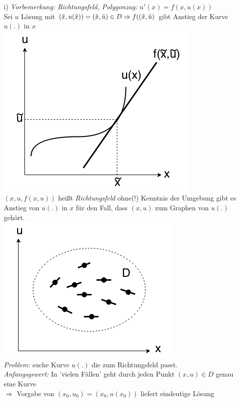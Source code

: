 \begin{enumerate}
    \item[i)] \emph{Vorbemerkung: Richtungsfeld, Polygonzug:} $u'(x) = f(x, u(x))$\\
        Sei $u$ Lösung mit $(\tilde{x}, u(\tilde{x})) = (\tilde{x}, \tilde{u}) \in D\\
        \Rightarrow f((\tilde{x}, \tilde{u}) $ gibt Anstieg der Kurve $u(.) $ in $x$\\
        \includegraphics[scale=0.5]{pictures/011-04.png}\\
        $(x, u, f(x,u)) $ heißt \emph{Richtungsfeld}
        ohne(!) Kenntnis der Umgebung gibt es Anstieg von $u(.)$ in $x$ 
        für den Fall, dass $(x,u) $ zum Graphen von $u(.) $ gehört.\\
        \includegraphics[scale=0.5]{pictures/011-05.png}\\
        \emph{Problem:} suche Kurve $u(.) $ die zum Richtungsfeld passt.\\
        \emph{Anfangsgswert:} In 'vielen Fällen' geht durch jeden Punkt $(x,u) \in D $
        genau eine Kurve \\
        $\Rightarrow $ Vorgabe von $(x_0, u_0) = (x_0, u(x_0)) $ 
        liefert eindeutige Lösung
        

\end{enumerate}
